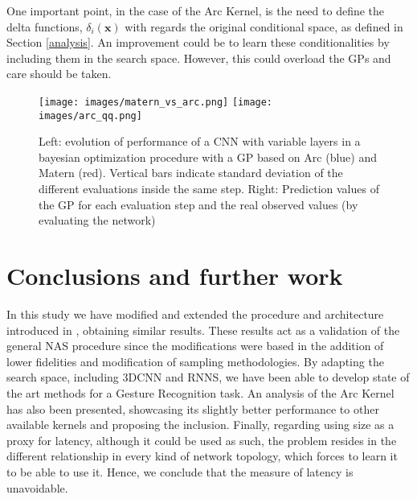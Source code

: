 \documentclass[10pt, a4paper, twocolumn]{article}
\begin{document}
One important point, in the case of the Arc Kernel, is the need to define the delta functions, $\delta_{i}(\mathbf{x})$ with regards the original conditional space, as defined in Section \ref{analysis}.  An improvement could be to learn these conditionalities by including them in the search space. However, this could overload the GPs and care should be taken.


\begin{figure*}
	\centering
\texttt{[image: images/matern\_vs\_arc.png]}
\texttt{[image: images/arc\_qq.png]}
\caption{Left: evolution of performance of a CNN with variable layers in a bayesian optimization procedure with a GP based on Arc (blue) and Matern (red). Vertical bars indicate standard deviation of the different evaluations inside the same step. Right: Prediction values of the GP for each evaluation step and the real observed values (by evaluating the network)}
\label{fig:arc}
\end{figure*}


\section{Conclusions and further work}

In this study we have modified and extended the procedure and architecture introduced in \cite{Fedorov2019}, obtaining similar results. These results act as a validation of the general NAS procedure since the modifications were based in the addition of lower fidelities and modification of sampling methodologies. By adapting the search space, including 3DCNN and RNNS, we have been able to develop state of the art methods for a Gesture Recognition task. An analysis of the Arc Kernel \cite{Swersky2014} has also been presented, showcasing its slightly better performance to other available kernels and proposing the inclusion. Finally, regarding using size as a proxy for latency, although it could be used as such, the problem resides in the different relationship in every kind of network topology, which forces to learn it to be able to use it. Hence, we conclude that the measure of latency is unavoidable.


\end{document}
